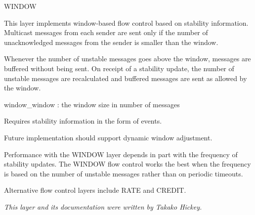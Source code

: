 %
%
%
\begin{Layer}{WINDOW} 

This layer implements window-based flow control based on stability information.
Multicast messages from each sender are sent only if the number of
unacknowledged messages from the sender is smaller than the window.

\begin{Protocol}
Whenever the number of unstable messages goes above the window, messages
are buffered without being sent.  On receipt of a stability update, the
number of unstable messages are recalculated and buffered messages are sent
as allowed by the window.
\end{Protocol}

\begin{Parameters}
\item window\_window : the window size in number of messages
\end{Parameters}

\begin{Properties}
\item
Requires stability information in the form of  events.
\end{Properties}

\begin{Notes}
\item 
Future implementation should support dynamic window adjustment.
\item 
Performance with the WINDOW layer depends in part with the frequency of
stability updates.  The WINDOW flow control works the best when the
frequency is based on the number of unstable messages rather than on
periodic timeouts.
\item 
Alternative flow control layers include RATE and CREDIT.
\end{Notes}

\begin{Sources}
\end{Sources}

\emph{This layer and its documentation were written by Takako Hickey.}
\end{Layer}
